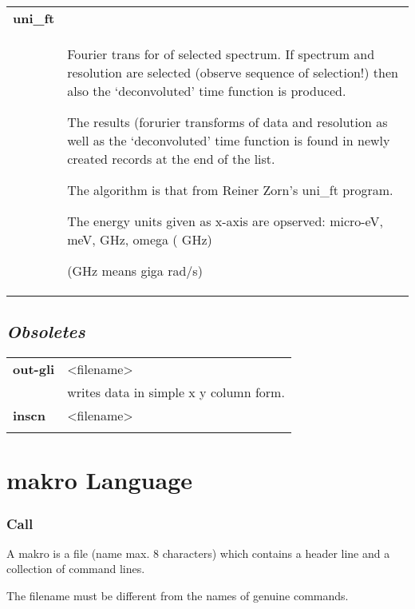 \documentclass[]{article}
\begin{document}
\begin{longtable}[]{@{}ll@{}}
\toprule
\endhead
\textbf{uni\_ft} &\tabularnewline
\begin{minipage}[t]{0.47\columnwidth}\raggedright
\strut
\end{minipage} & \begin{minipage}[t]{0.47\columnwidth}\raggedright
Fourier trans for of selected spectrum. If spectrum and resolution are
selected (observe sequence of selection!) then also the `deconvoluted'
time function is produced.

The results (forurier transforms of data and resolution as well as the
`deconvoluted' time function is found in newly created records at the
end of the list.

The algorithm is that from Reiner Zorn's uni\_ft program.

The energy units given as x-axis are opserved: micro-eV, meV, GHz, omega
( GHz)

(GHz means giga rad/s)\strut
\end{minipage}\tabularnewline
\bottomrule
\end{longtable}

\hypertarget{obsoletes}{%
\subsection{\texorpdfstring{\emph{Obsoletes}}{Obsoletes}}\label{obsoletes}}

\begin{longtable}[]{@{}ll@{}}
\toprule
\endhead
\textbf{out-gli} & \textless{}filename\textgreater{}\tabularnewline
& writes data in simple x y column form.\tabularnewline
\textbf{inscn} & \textless{}filename\textgreater{}\tabularnewline
&\tabularnewline
\bottomrule
\end{longtable}

\hypertarget{makro-language}{%
\section{makro Language}\label{makro-language}}

\hypertarget{call}{%
\subsubsection{Call}\label{call}}

A makro is a file (name max. 8 characters) which contains a header line
and a collection of command lines.

The filename must be different from the names of genuine commands.
\end{document}
